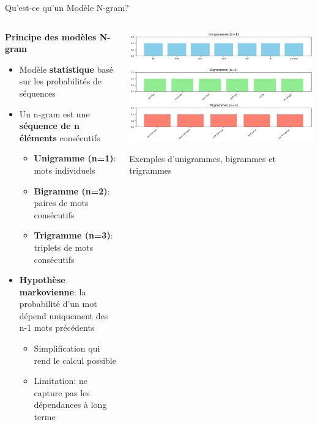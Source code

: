 \documentclass[aspectratio=169,11pt]{beamer}
\begin{document}
\begin{frame}{Qu'est-ce qu'un Modèle N-gram?}
    \begin{columns}
        \begin{column}{0.55\textwidth}
            \textbf{Principe des modèles N-gram}
            \begin{itemize}
                \item Modèle \textbf{statistique} basé sur les probabilités de séquences
                \item Un n-gram est une \textbf{séquence de n éléments} consécutifs
                \begin{itemize}
                    \item \textbf{Unigramme (n=1)}: mots individuels 
                    \item \textbf{Bigramme (n=2)}: paires de mots consécutifs
                    \item \textbf{Trigramme (n=3)}: triplets de mots consécutifs
                \end{itemize}
                \vspace{0.3cm}
                \item \textbf{Hypothèse markovienne}: la probabilité d'un mot dépend uniquement des n-1 mots précédents
                \begin{itemize}
                    \item Simplification qui rend le calcul possible
                    \item Limitation: ne capture pas les dépendances à long terme
                \end{itemize}
            \end{itemize}
        \end{column}
        \begin{column}{0.45\textwidth}
            \includegraphics[width=\textwidth]{images/generated/ngram_model.png}
            \vspace{0.1cm}
            \begin{center}
                \small{Exemples d'unigrammes, bigrammes et trigrammes}
            \end{center}
        \end{column}
    \end{columns}
\end{frame}
\end{document}
